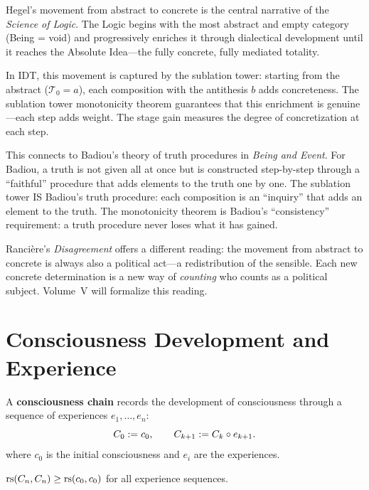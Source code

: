 \begin{interpretation}
Hegel's movement from abstract to concrete is the central narrative of the
\textit{Science of Logic}. The Logic begins with the most abstract and
empty category (Being = void) and progressively enriches it through
dialectical development until it reaches the Absolute Idea---the fully
concrete, fully mediated totality.

In IDT, this movement is captured by the sublation tower: starting from
the abstract ($\mathcal{T}_0 = a$), each composition with the antithesis $b$
adds concreteness. The sublation tower monotonicity theorem guarantees that
this enrichment is genuine---each step adds weight. The stage gain measures
the degree of concretization at each step.

This connects to Badiou's theory of truth procedures in \textit{Being and
Event}. For Badiou, a truth is not given all at once but is constructed
step-by-step through a ``faithful'' procedure that adds elements to the
truth one by one. The sublation tower IS Badiou's truth procedure: each
composition is an ``inquiry'' that adds an element to the truth.
The monotonicity theorem is Badiou's ``consistency'' requirement: a truth
procedure never loses what it has gained.

Rancière's \textit{Disagreement} offers a different reading: the movement
from abstract to concrete is always also a political act---a redistribution
of the sensible. Each new concrete determination is a new way of
\emph{counting} who counts as a political subject. Volume~V will formalize
this reading.
\end{interpretation}

\section{Consciousness Development and Experience}

\begin{definition}
\label{def:consciousness-chain}
A \textbf{consciousness chain} records the development of consciousness
through a sequence of experiences $e_1, \ldots, e_n$:
\[
C_0 := c_0, \qquad C_{k+1} := C_k \circ e_{k+1}.
\]
where $c_0$ is the initial consciousness and $e_i$ are the experiences.
\end{definition}

\begin{theorem}
\label{thm:consciousness-develops}
$\mathrm{rs}(C_n, C_n) \geq \mathrm{rs}(c_0, c_0)$ for all experience sequences.
\end{theorem}


